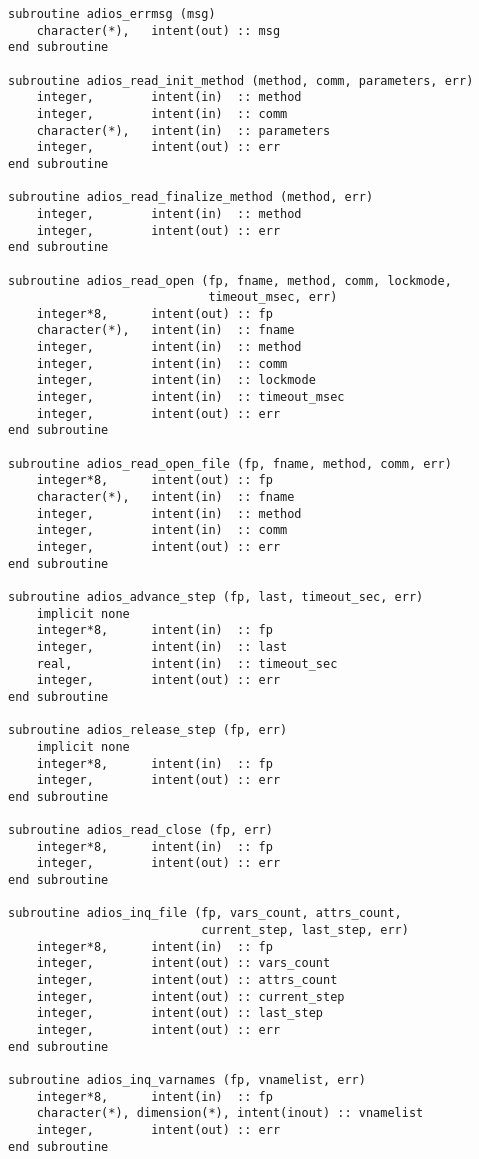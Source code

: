 \begin{lstlisting}[language=ADIOS,alsolanguage=Fortran]
subroutine adios_errmsg (msg)
    character(*),   intent(out) :: msg
end subroutine

subroutine adios_read_init_method (method, comm, parameters, err)
    integer,        intent(in)  :: method
    integer,        intent(in)  :: comm
    character(*),   intent(in)  :: parameters
    integer,        intent(out) :: err
end subroutine

subroutine adios_read_finalize_method (method, err)
    integer,        intent(in)  :: method
    integer,        intent(out) :: err
end subroutine

subroutine adios_read_open (fp, fname, method, comm, lockmode, 
                            timeout_msec, err)
    integer*8,      intent(out) :: fp
    character(*),   intent(in)  :: fname
    integer,        intent(in)  :: method
    integer,        intent(in)  :: comm
    integer,        intent(in)  :: lockmode
    integer,        intent(in)  :: timeout_msec
    integer,        intent(out) :: err
end subroutine

subroutine adios_read_open_file (fp, fname, method, comm, err)
    integer*8,      intent(out) :: fp
    character(*),   intent(in)  :: fname
    integer,        intent(in)  :: method
    integer,        intent(in)  :: comm
    integer,        intent(out) :: err
end subroutine

subroutine adios_advance_step (fp, last, timeout_sec, err)
    implicit none
    integer*8,      intent(in)  :: fp
    integer,        intent(in)  :: last
    real,           intent(in)  :: timeout_sec
    integer,        intent(out) :: err
end subroutine

subroutine adios_release_step (fp, err)
    implicit none
    integer*8,      intent(in)  :: fp
    integer,        intent(out) :: err
end subroutine

subroutine adios_read_close (fp, err)
    integer*8,      intent(in)  :: fp
    integer,        intent(out) :: err
end subroutine

subroutine adios_inq_file (fp, vars_count, attrs_count, 
                           current_step, last_step, err)
    integer*8,      intent(in)  :: fp
    integer,        intent(out) :: vars_count
    integer,        intent(out) :: attrs_count
    integer,        intent(out) :: current_step
    integer,        intent(out) :: last_step
    integer,        intent(out) :: err
end subroutine

subroutine adios_inq_varnames (fp, vnamelist, err)
    integer*8,      intent(in)  :: fp
    character(*), dimension(*), intent(inout) :: vnamelist
    integer,        intent(out) :: err
end subroutine


\end{lstlisting}
